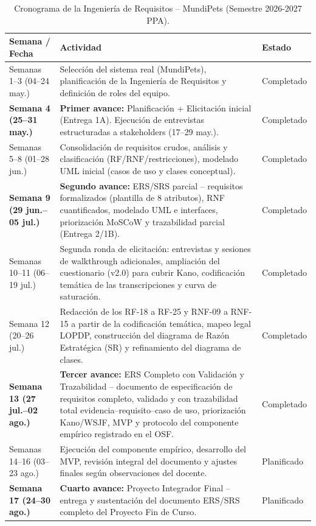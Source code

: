 \documentclass[journal,onecolumn]{IEEEtran}
\begin{document}
	\begin{table}[H]
		\caption{Cronograma de la Ingeniería de Requisitos -- MundiPets (Semestre 2026-2027 PPA).}
		\centering
		
		\begin{tabularx}{\linewidth}{|C{2.5cm}|X|C{2.8cm}|}
			\hline
			\textbf{Semana / Fecha} & \textbf{Actividad} & \textbf{Estado} \\
			\hline
			Semanas 1--3 (04--24 may.) & Selección del sistema real (MundiPets), planificación de la Ingeniería de Requisitos y definición de roles del equipo. & Completado \\
			\hline
			\textbf{Semana 4 (25--31 may.)} & \textbf{Primer avance:} Planificación + Elicitación inicial (Entrega 1A). Ejecución de entrevistas estructuradas a stakeholders (17--29 may.). & Completado \\
			\hline
			Semanas 5--8 (01--28 jun.) & Consolidación de requisitos crudos, análisis y clasificación (RF/RNF/restricciones), modelado UML inicial (casos de uso y clases conceptual). & Completado \\
			\hline
			\textbf{Semana 9 (29 jun.--05 jul.)} & \textbf{Segundo avance:} ERS/SRS parcial -- requisitos formalizados (plantilla de 8 atributos), RNF cuantificados, modelado UML e interfaces, priorización MoSCoW y trazabilidad parcial (Entrega 2/1B). & Completado \\
			\hline
			Semanas 10--11 (06--19 jul.) & Segunda ronda de elicitación: entrevistas y sesiones de walkthrough adicionales, ampliación del cuestionario (v2.0) para cubrir Kano, codificación temática de las transcripciones y curva de saturación. & Completado \\
			\hline
			Semana 12 (20--26 jul.) & Redacción de los RF-18 a RF-25 y RNF-09 a RNF-15 a partir de la codificación temática, mapeo legal LOPDP, construcción del diagrama de Razón Estratégica (SR) y refinamiento del diagrama de clases. & Completado \\
			\hline
			\textbf{Semana 13 (27 jul.--02 ago.)} & \textbf{Tercer avance:} ERS Completo con Validación y Trazabilidad -- documento de especificación de requisitos completo, validado y con trazabilidad total evidencia--requisito--caso de uso, priorización Kano/WSJF, MVP y protocolo del componente empírico registrado en el OSF. & Completado \\
			\hline
			Semanas 14--16 (03--23 ago.) & Ejecución del componente empírico, desarrollo del MVP, revisión integral del documento y ajustes finales según observaciones del docente. & Planificado \\
			\hline
			\textbf{Semana 17 (24--30 ago.)} & \textbf{Cuarto avance:} Proyecto Integrador Final -- entrega y sustentación del documento ERS/SRS completo del Proyecto Fin de Curso. & Planificado \\
			\hline
		\end{tabularx}
	\end{table}
	
\end{document}
